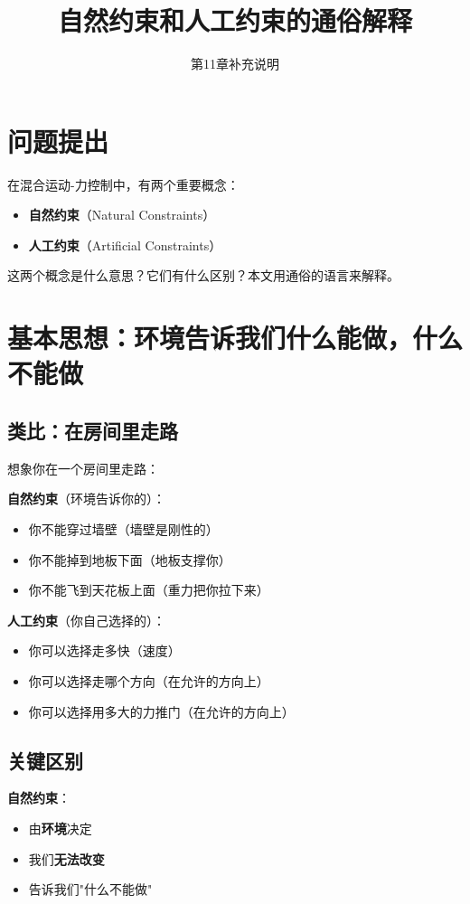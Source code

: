 \documentclass[12pt,a4paper]{article}
\title{自然约束和人工约束的通俗解释}
\author{第11章补充说明}
\date{}
\begin{document}
\maketitle

\section{问题提出}

在混合运动-力控制中，有两个重要概念：
\begin{itemize}
\item \textbf{自然约束}（Natural Constraints）
\item \textbf{人工约束}（Artificial Constraints）
\end{itemize}

这两个概念是什么意思？它们有什么区别？本文用通俗的语言来解释。

\section{基本思想：环境告诉我们什么能做，什么不能做}

\subsection{类比：在房间里走路}

想象你在一个房间里走路：

\textbf{自然约束}（环境告诉你的）：
\begin{itemize}
\item 你不能穿过墙壁（墙壁是刚性的）
\item 你不能掉到地板下面（地板支撑你）
\item 你不能飞到天花板上面（重力把你拉下来）
\end{itemize}

\textbf{人工约束}（你自己选择的）：
\begin{itemize}
\item 你可以选择走多快（速度）
\item 你可以选择走哪个方向（在允许的方向上）
\item 你可以选择用多大的力推门（在允许的方向上）
\end{itemize}

\subsection{关键区别}

\textbf{自然约束}：
\begin{itemize}
\item 由\textbf{环境}决定
\item 我们\textbf{无法改变}
\item 告诉我们"什么不能做"
\end{itemize}
\end{document}
